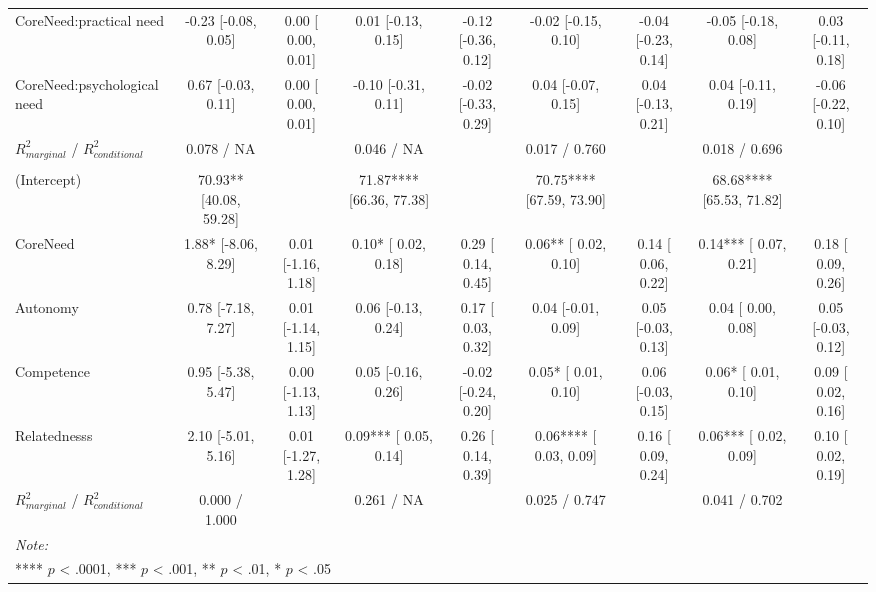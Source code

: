 \begin{table}
\begin{minipage}[t][\textheight][t]{\textwidth}
{\begin{tabular}[t]{lcccccccc}
\hspace{1em}CoreNeed:practical need & -0.23 [-0.08,  0.05] & 0.00 [ 0.00, 0.01] & 0.01 [-0.13,  0.15] & -0.12 [-0.36, 0.12] & -0.02 [-0.15,  0.10] & -0.04 [-0.23, 0.14] & -0.05 [-0.18,  0.08] & 0.03 [-0.11, 0.18]\\
\hspace{1em}CoreNeed:psychological need & 0.67 [-0.03,  0.11] & 0.00 [ 0.00, 0.01] & -0.10 [-0.31,  0.11] & -0.02 [-0.33, 0.29] & 0.04 [-0.07,  0.15] & 0.04 [-0.13, 0.21] & 0.04 [-0.11,  0.19] & -0.06 [-0.22, 0.10]\\
\hspace{1em}$R^2_{marginal}$ / $R^2_{conditional}$ & 0.078 / NA &  & 0.046 / NA &  & 0.017 / 0.760 &  & 0.018 / 0.696 & \\
\addlinespace[0.3em]
\multicolumn{9}{l}{\textbf{Specific Psychological Needs}}\\
\hspace{1em}(Intercept) & 70.93** [40.08, 59.28] &  & 71.87**** [66.36, 77.38] &  & 70.75**** [67.59, 73.90] &  & 68.68**** [65.53, 71.82] & \\
\hspace{1em}CoreNeed & 1.88* [-8.06,  8.29] & 0.01 [-1.16, 1.18] & 0.10* [ 0.02,  0.18] & 0.29 [ 0.14, 0.45] & 0.06** [ 0.02,  0.10] & 0.14 [ 0.06, 0.22] & 0.14*** [ 0.07,  0.21] & 0.18 [ 0.09, 0.26]\\
\hspace{1em}Autonomy & 0.78 [-7.18,  7.27] & 0.01 [-1.14, 1.15] & 0.06 [-0.13,  0.24] & 0.17 [ 0.03, 0.32] & 0.04 [-0.01,  0.09] & 0.05 [-0.03, 0.13] & 0.04 [ 0.00,  0.08] & 0.05 [-0.03, 0.12]\\
\hspace{1em}Competence & 0.95 [-5.38,  5.47] & 0.00 [-1.13, 1.13] & 0.05 [-0.16,  0.26] & -0.02 [-0.24, 0.20] & 0.05* [ 0.01,  0.10] & 0.06 [-0.03, 0.15] & 0.06* [ 0.01,  0.10] & 0.09 [ 0.02, 0.16]\\
\hspace{1em}Relatednesss & 2.10 [-5.01,  5.16] & 0.01 [-1.27, 1.28] & 0.09*** [ 0.05,  0.14] & 0.26 [ 0.14, 0.39] & 0.06**** [ 0.03,  0.09] & 0.16 [ 0.09, 0.24] & 0.06*** [ 0.02,  0.09] & 0.10 [ 0.02, 0.19]\\
\hspace{1em}$R^2_{marginal}$ / $R^2_{conditional}$ & 0.000 / 1.000 &  & 0.261 / NA &  & 0.025 / 0.747 &  & 0.041 / 0.702 & \\
\bottomrule
\multicolumn{9}{l}{\rule{0pt}{1em}\textit{Note: }}\\
\multicolumn{9}{l}{\rule{0pt}{1em}**** $p$ < .0001, *** $p$ < .001, ** $p$ < .01, * $p$ < .05}\\
\end{tabular}}
\end{minipage}
\end{table}
